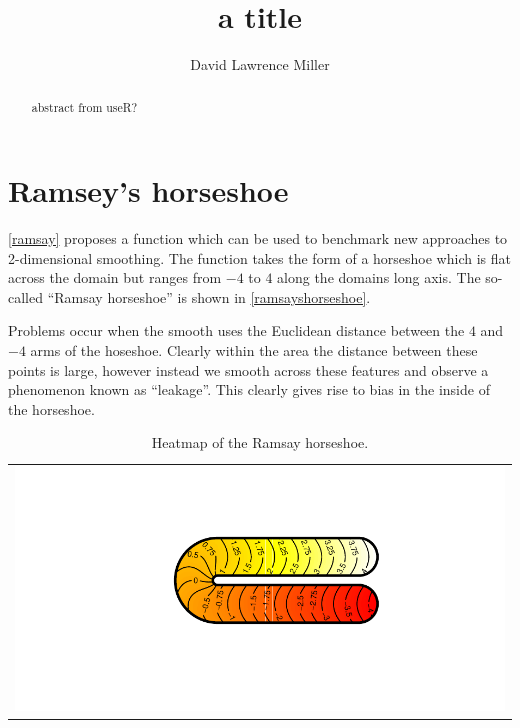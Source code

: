 \documentclass[a4paper,10pt]{amsart}
\title{a title}
\author{David Lawrence Miller}
\begin{document}
\begin{abstract}
abstract from useR?
\end{abstract}


\newtheorem{thm}{Theorem}[section]

\newtheorem{defn}{Definition}[section]

\maketitle



\section{Ramsey's horseshoe}

\ref{ramsay} proposes a function which can be used to benchmark new approaches to 2-dimensional smoothing. The function takes the form of a horseshoe which is flat across the domain but ranges from $-4$ to $4$ along the domains long axis. The so-called ``Ramsay horseshoe'' is shown in \ref{ramsayshorseshoe}.

Problems occur when the smooth uses the Euclidean distance between the $4$ and $-4$ arms of the hoseshoe. Clearly within the area the distance between these points is large, however instead we smooth across these features and observe a phenomenon known as ``leakage''. This clearly gives rise to bias in the inside of the horseshoe.


\begin{table}
\centering
\begin{tabular}{c}
\includegraphics[scale=0.25]{figs/ramsayhorseshoe.pdf} \\
\end{tabular}
\caption{Heatmap of the Ramsay horseshoe.}
\label{rtest}
\end{table}
\end{document}
